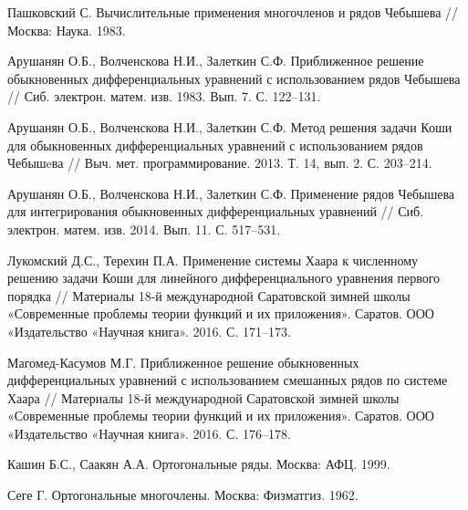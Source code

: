 \begin{thebibliography}{999}

 Пашковский С. Вычислительные применения многочленов и рядов Чебышева // Москва: Наука. 1983.




 Арушанян О.Б., Волченскова Н.И., Залеткин С.Ф. Приближенное решение обыкновенных дифференциальных уравнений с использованием рядов Чебышева // Сиб. электрон. матем. изв. 1983. Вып. 7. С. 122--131.




Арушанян О.Б., Волченскова Н.И., Залеткин С.Ф. Метод решения задачи Коши для обыкновенных дифференциальных уравнений с использованием рядов Чебышeва // Выч. мет. программирование. 2013. Т. 14, вып. 2. С. 203--214.




 Арушанян О.Б., Волченскова Н.И., Залеткин С.Ф. Применение рядов Чебышева для интегрирования обыкновенных дифференциальных уравнений // Сиб. электрон. матем. изв. 2014. Вып. 11. С. 517--531.




 Лукомский Д.С., Терехин П.А. Применение системы Хаара к численному решению задачи Коши для линейного дифференциального уравнения первого порядка // Материалы 18-й международной Саратовской зимней школы «Современные проблемы теории функций и их приложения». Саратов. ООО «Издательство «Научная книга». 2016. С. 171--173.




 Магомед-Касумов М.Г. Приближенное решение обыкновенных дифференциальных уравнений с использованием смешанных рядов по системе Хаара // Материалы 18-й международной Саратовской зимней школы «Современные проблемы теории функций и их приложения». Саратов. ООО «Издательство «Научная книга». 2016. С. 176--178.




 Кашин Б.С., Саакян А.А. Ортогональные ряды. Москва: АФЦ. 1999.




 Сеге Г. Ортогональные многочлены. Москва: Физматгиз. 1962.




\end{thebibliography}
